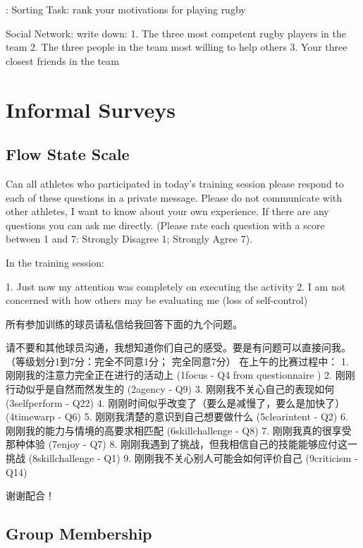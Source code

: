 :
Sorting Task: rank your motivations for playing rugby


Social Network: write down:
1.	The three most competent rugby players in the team
2.	The three people in the team most willing to help others
3.	Your three closest friends in the team



\section{Informal Surveys}



      \subsection{Flow State Scale\label{sect:flowStateScale}}

Can all athletes who participated in today's training session please respond to each of these questions in a private message.  Please do not communicate with other athletes, I want to know about your own experience.  If there are any questions you can ask me directly.
(Please rate each question with a score between 1 and 7: Strongly Disagree 1; Strongly Agree 7).

In the training session:

1. Just now my attention was completely on executing the activity
2.
I am not concerned with how others may be evaluating me (loss of self-control)

      所有参加训练的球员请私信给我回答下面的九个问题。

      请不要和其他球员沟通，我想知道你们自己的感受。要是有问题可以直接问我。
      （等级划分1到7分：完全不同意1分； 完全同意7分）
      在上午的比赛过程中：
      1. 刚刚我的注意力完全正在进行的活动上 (1focus - Q4 from questionnaire )
      2. 刚刚行动似乎是自然而然发生的 (2agency - Q9)
      3. 刚刚我不关心自己的表现如何 (3selfperform - Q22)
      4. 刚刚时间似乎改变了（要么是减慢了，要么是加快了）(4timewarp - Q6)
      5. 刚刚我清楚的意识到自己想要做什么 (5clearintent - Q2)
      6. 刚刚我的能力与情境的高要求相匹配 (6skillchallenge - Q8)
      7. 刚刚我真的很享受那种体验 (7enjoy - Q7)
      8. 刚刚我遇到了挑战，但我相信自己的技能能够应付这一挑战 (8skillchallenge - Q1)
      9. 刚刚我不关心别人可能会如何评价自己  (9criticism - Q14)

      谢谢配合！



      \subsection{Group Membership}



 
